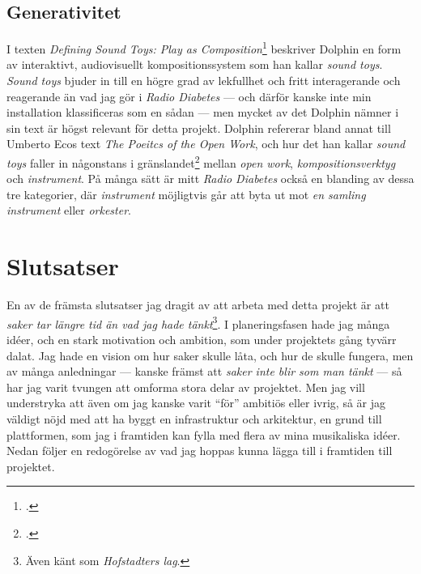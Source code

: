 \documentclass[11pt, a4paper]{article} %
\begin{document}
\subsection*{Generativitet}
I texten \emph{Defining Sound Toys: Play as Composition}\footcite{collins_defining_2014} beskriver Dolphin en form av interaktivt, audiovisuellt kompositionssystem som han kallar \emph{sound toys}. \emph{Sound toys} bjuder in till en högre grad av lekfullhet och fritt interagerande och reagerande än vad jag gör i \emph{Radio Diabetes} --- och därför kanske inte min installation klassificeras som en sådan --- men mycket av det Dolphin nämner i sin text är högst relevant för detta projekt. Dolphin refererar bland annat till Umberto Ecos text \emph{The Poeitcs of the Open Work}, och hur det han kallar \emph{sound toys} faller in någonstans i gränslandet\footcite[53]{collins_defining_2014} mellan \emph{open work}, \emph{kompositionsverktyg} och \emph{instrument}. På många sätt är mitt \emph{Radio Diabetes} också en blanding av dessa tre kategorier, där \emph{instrument} möjligtvis går att byta ut mot \emph{en samling instrument} eller \emph{orkester}. 

\section*{Slutsatser}
En av de främsta slutsatser jag dragit av att arbeta med detta projekt är att \emph{saker tar längre tid än vad jag hade tänkt}\footnote{Även känt som \emph{Hofstadters lag}.}. I planeringsfasen hade jag många idéer, och en stark motivation och ambition, som under projektets gång tyvärr dalat. Jag hade en vision om hur saker skulle låta, och hur de skulle fungera, men av många anledningar --- kanske främst att \emph{saker inte blir som man tänkt} --- så har jag varit tvungen att omforma stora delar av projektet. Men jag vill understryka att även om jag kanske varit ``för'' ambitiös eller ivrig, så är jag väldigt nöjd med att ha byggt en infrastruktur och arkitektur, en grund till plattformen, som jag i framtiden kan fylla med flera av mina musikaliska idéer. Nedan följer en redogörelse av vad jag hoppas kunna lägga till i framtiden till projektet.
\end{document}

